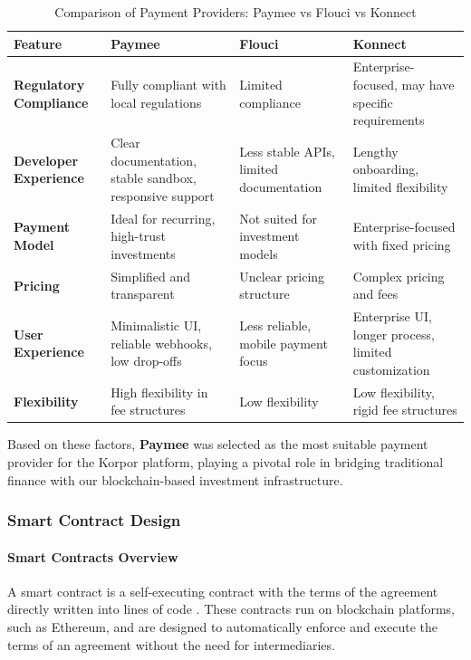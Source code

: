 \begin{table}[htbp]
\centering
\caption{Comparison of Payment Providers: Paymee vs Flouci vs Konnect}
\label{tab:payment_comparison}
\begin{tabular}{|p{4cm}|p{3.5cm}|p{3.5cm}|p{3.5cm}|}
\hline
\textbf{Feature} & \textbf{Paymee} & \textbf{Flouci} & \textbf{Konnect} \\ \hline
\textbf{Regulatory Compliance} & Fully compliant with local regulations & Limited compliance & Enterprise-focused, may have specific requirements \\ \hline
\textbf{Developer Experience} & Clear documentation, stable sandbox, responsive support & Less stable APIs, limited documentation & Lengthy onboarding, limited flexibility \\ \hline
\textbf{Payment Model} & Ideal for recurring, high-trust investments & Not suited for investment models & Enterprise-focused with fixed pricing \\ \hline
\textbf{Pricing} & Simplified and transparent & Unclear pricing structure & Complex pricing and fees \\ \hline
\textbf{User Experience} & Minimalistic UI, reliable webhooks, low drop-offs & Less reliable, mobile payment focus & Enterprise UI, longer process, limited customization \\ \hline
\textbf{Flexibility} & High flexibility in fee structures & Low flexibility & Low flexibility, rigid fee structures \\ \hline
\end{tabular}
\end{table}

Based on these factors, \textbf{Paymee} was selected as the most suitable payment provider for the Korpor platform, playing a pivotal role in bridging traditional finance with our blockchain-based investment infrastructure.

\subsubsection{Smart Contract Design}

\paragraph{Smart Contracts Overview}

A smart contract is a self-executing contract with the terms of the agreement directly written into lines of code \cite{Szabo1997SmartContracts}. These contracts run on blockchain platforms, such as Ethereum, and are designed to automatically enforce and execute the terms of an agreement without the need for intermediaries. 


